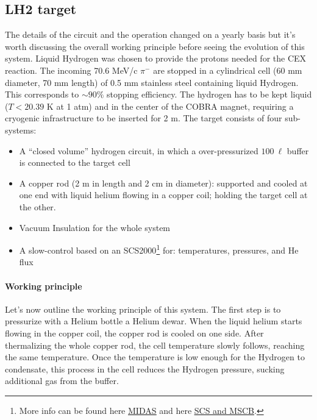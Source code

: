 \begin{refsection}
\section{LH2 target}
    The details of the circuit and the operation changed on a yearly basis but it's worth discussing the overall working principle before seeing the evolution of this system.
    Liquid Hydrogen was chosen to provide the protons needed for the CEX reaction.  
    The incoming 70.6 MeV/c $\pi^-$ are stopped in a cylindrical cell (60 mm diameter, 70 mm length) of 0.5 mm stainless steel containing liquid Hydrogen. 
    This corresponds to $\sim 90\%$ stopping efficiency.
    The hydrogen has to be kept liquid ($T<20.39$ K at 1 atm) and in the center of the COBRA magnet, requiring a cryogenic infrastructure to be inserted for 2 m.
    The target consists of four sub-systems:
    \begin{itemize}
        \item A ``closed volume'' hydrogen circuit, in which a over-pressurized $100\ \ell$ buffer is connected to the target cell 
        \item  A copper rod (2 m in length and 2 cm in diameter): supported and cooled at one end with liquid helium flowing in a copper coil; holding the target cell at the other.
        \item Vacuum Insulation for the whole system
        \item A slow-control based on an SCS2000\footnote{More info can be found here \href{https://daq00.triumf.ca/MidasWiki/index.php/Main_Page}{\underline{MIDAS}} and here \href{https://www.psi.ch/en/ltp-electronics/www-documents}{\underline{SCS and MSCB}}.} for: temperatures, pressures, and He flux
    \end{itemize}
    
    \paragraph{Working principle}
    Let's now outline the working principle of this system.
    The first step is to pressurize with a Helium bottle a Helium dewar.
    When the liquid helium starts flowing in the copper coil, the copper rod is cooled on one side.
    After thermalizing the whole copper rod, the cell temperature slowly follows, reaching the same temperature.
    Once the temperature is low enough for the Hydrogen to condensate, this process in the cell reduces the Hydrogen pressure, sucking additional gas from the buffer.


\end{refsection}
